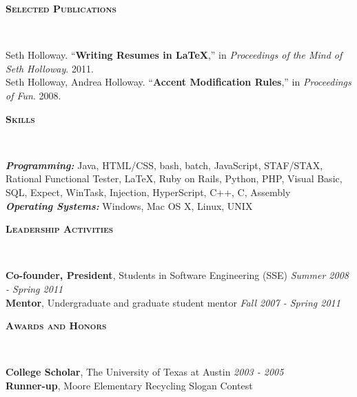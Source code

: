 \documentclass[9pt]{article}
\newenvironment{changemargin}[2]{%
  \begin{list}{}{%
    \setlength{\topsep}{0pt}%
    \setlength{\leftmargin}{#1}%
    \setlength{\rightmargin}{#2}%
    \setlength{\listparindent}{\parindent}%
    \setlength{\itemindent}{\parindent}%
    \setlength{\parsep}{\parskip}%
  }%
  \item[]}{\end{list}
}
\newcommand{\lineover}{
	\begin{changemargin}{-0.05in}{-0.05in}
		\vspace*{-8pt}
		\hrulefill \\
		\vspace*{-2pt}
	\end{changemargin}
}
\newcommand{\header}[1]{
	\begin{changemargin}{-0.5in}{-0.5in}
		\scshape{#1}\\
  	\lineover
	\end{changemargin}
}
\newenvironment{body} {
	\vspace*{-16pt}
	\begin{changemargin}{-0.25in}{-0.5in}
  }	
	{\end{changemargin}
}
\begin{document}
\smallskip





\header{\textbf{Selected Publications}}

\begin{body}
	\vspace{14pt}
	Seth Holloway. ``\textbf{Writing Resumes in LaTeX},'' in \emph{Proceedings of the Mind of Seth Holloway}. 2011.\\
	\smallskip
	Seth Holloway, Andrea Holloway. ``\textbf{Accent Modification Rules},'' in \emph{Proceedings of Fun}. 2008.\\
\end{body}

\smallskip


\header{\textbf{Skills}}

\begin{body}
	\vspace{14pt}
	\emph{\textbf{Programming:}}{} Java, HTML/CSS, bash, batch, JavaScript, STAF/STAX, Rational Functional Tester, \LaTeX, Ruby on Rails, Python, PHP, Visual Basic, SQL, Expect, WinTask, Injection, HyperScript, C++, C, Assembly\\
	\medskip
	\emph{\textbf{Operating Systems:}}{} Windows, Mac OS X, Linux, UNIX\\
\end{body}

\smallskip


\header{\textbf{Leadership Activities}}

\begin{body}
	\vspace{14pt}
	\textbf{Co-founder, President}, Students in Software Engineering (SSE) \hfill {} \emph{Summer 2008 - Spring 2011}\\
	\smallskip
	\textbf{Mentor}, Undergraduate and graduate student mentor \hfill{} \emph{Fall 2007 - Spring 2011}\\
\end{body}

\smallskip


\header{\textbf{Awards and Honors}}

\begin{body}
	\vspace{14pt}
	\textbf{College Scholar}, The University of Texas at Austin \hfill{} \emph{2003 - 2005}\\
	\smallskip
	\textbf{Runner-up}, Moore Elementary Recycling Slogan Contest
\end{body}
\end{document}
